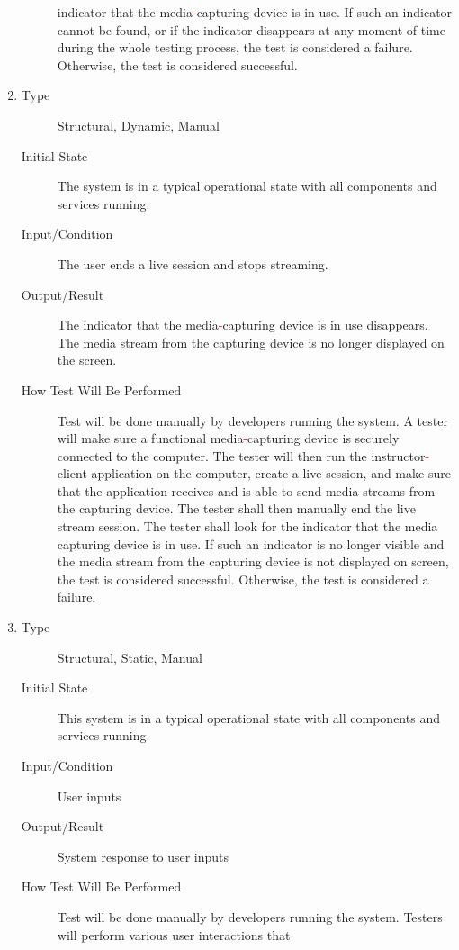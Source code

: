 \documentclass[12pt, titlepage]{article}
\newcommand{\rt}[1]{\textcolor{red}{#1}}
\begin{document}
\begin{enumerate}[NFR-T1]
\begin{description}
    indicator that the media\rt{-}capturing device is in use. If such an indicator
    cannot be found, or if the indicator disappears at any moment of time during
    the whole testing process, the test is considered a failure. Otherwise, the
    test is considered successful.
  \end{description}
\item \label{NFRT26}
  \begin{description}
  \item[Type] Structural, Dynamic, Manual
  \item[Initial State] The system is in a typical operational state with all
    components and services running.
  \item[Input/Condition] The user ends a live session and stops streaming.
  \item[Output/Result] The indicator that the media\rt{-}capturing device is in use
    disappears. The media stream from the capturing device is no longer
    displayed on the screen.
  \item[How Test Will Be Performed] Test will be done manually by developers
    running the system. A tester will make sure a functional media\rt{-}capturing
    device is securely connected to the computer. The tester will then run the
    instructor\rt{-}client application on the computer, create a live session, and
    make sure that the application receives and is able to send media streams
    from the capturing device. The tester shall then manually end the live
    stream session. The tester shall look for the indicator that the media
    capturing device is in use. If such an indicator is no longer visible and
    the media stream from the capturing device is not displayed on screen, the
    test is considered successful. Otherwise, the test is considered a failure.
  \end{description}
\item \label{NFRT27}
  \begin{description}
  \item[Type] Structural, Static, Manual
  \item[Initial State] This system is in a typical operational state with all
    components and services running.
  \item[Input/Condition] User inputs
  \item[Output/Result] System response to user inputs
  \item[How Test Will Be Performed] Test will be done manually by developers
    running the system. Testers will perform various user interactions that

\end{description}
\end{enumerate}
\end{document}

